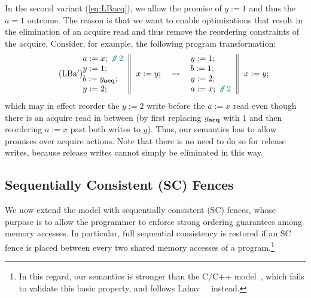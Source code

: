 In the second variant (\ref{eq:LBacq}), we allow the promise of $y:=1$ and thus the $a=1$ outcome.
The reason is that we want to enable optimizations that 
result in the elimination of an acquire read and thus remove the reordering constraints of the acquire.
Consider, for example, the following program transformation:
\begin{equation}\label{eq:acq_merge}\tag{LBa$'$}
\inarrII{a:=x;\comment{2}\\ y:=1;\\b := y_{\acqr};\\y:=2;}{x:=y;} \quad \leadsto \quad
\inarrII{y:=1;\\b := 1;\\y:=2;\\ a:=x;\comment{2}}{x:=y;}
\end{equation}
which may in effect reorder the $y:=2$ write before the $a:=x$ read even though there is an acquire read in between
(by first replacing $y_{\textbf{acq}}$ with $1$ and then reordering $a:=x$ past both writes to $y$).
Thus, our semantics has to allow promises over acquire actions.
Note that there is no need to do so for release writes, because release writes cannot simply be eliminated in this way.



\subsection{Sequentially Consistent (SC) Fences}
\label{sec:sc}

We now extend the model with sequentially consistent (SC) fences, 
whose purpose is to allow the programmer
to enforce strong ordering guarantees among memory accesses. 
In particular, full
sequential consistency is restored if an SC fence is  
placed between every two shared memory accesses of
a program.\footnote{In this regard, our semantics is stronger than the C/C++ model~\cite{Batty:2011},
which fails to validate this basic property, and follows Lahav~\etal~\cite{sra,repairing-sc} instead.} 

